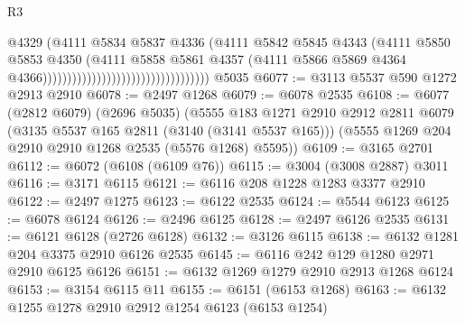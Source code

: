 \begin{lexlean}{R3}
\begin{coremodule}
                                                              @4329
                                                              (@4111
                                                                @5834
                                                                @5837
                                                                @4336
                                                                (@4111
                                                                  @5842
                                                                  @5845
                                                                  @4343
                                                                  (@4111
                                                                    @5850
                                                                    @5853
                                                                    @4350
                                                                    (@4111
                                                                      @5858
                                                                      @5861
                                                                      @4357
                                                                      (@4111
                                                                        @5866
                                                                        @5869
                                                                        @4364
                                                                        @4366))))))))))))))))))))))))))))))))))
    @5035
@6077 := @3113 @5537 @590 @1272 @2913 @2910
@6078 := @2497 @1268
@6079 := @6078 @2535
@6108 := @6077
    (@2812 @6079)
    (@2696 @5035)
    (@5555
      @183
      @1271
      @2910
      @2912
      @2811
      @6079
      (@3135 @5537 @165 @2811 (@3140 (@3141 @5537 @165)))
      (@5555 @1269 @204 @2910 @2910 @1268 @2535 (@5576 @1268) @5595))
@6109 := @3165 @2701
@6112 := @6072 (@6108 (@6109 @76))
@6115 := @3004 (@3008 @2887) @3011
@6116 := @3171 @6115
@6121 := @6116 @208 @1228 @1283 @3377 @2910
@6122 := @2497 @1275
@6123 := @6122 @2535
@6124 := @5544 @6123
@6125 := @6078 @6124
@6126 := @2496 @6125
@6128 := @2497 @6126 @2535
@6131 := @6121 @6128 (@2726 @6128)
@6132 := @3126 @6115
@6138 := @6132 @1281 @204 @3375 @2910 @6126 @2535
@6145 := @6116 @242 @129 @1280 @2971 @2910 @6125 @6126
@6151 := @6132 @1269 @1279 @2910 @2913 @1268 @6124
@6153 := @3154 @6115 @11
@6155 := @6151 (@6153 @1268)
@6163 := @6132 @1255 @1278 @2910 @2912 @1254 @6123 (@6153 @1254)

\end{coremodule}
\end{lexlean}
